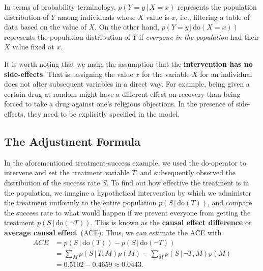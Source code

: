 \documentclass{article}
\newcommand{\giv}{\,|\,}
\begin{document}
In terms of probability terminology, $p(Y=y \giv X=x)$ represents the population distribution of $Y$ among individuals whose $X$ value is $x$, i.e., filtering a table of data based on the value of $X$. On the other hand, $p(Y=y \giv \text{do}(X=x))$ represents the population distribution of $Y$ if \textit{everyone in the population} had their $X$ value fixed at $x$. 

It is worth noting that we make the assumption that the \textbf{intervention has no side-effects}. That is, assigning the value $x$ for the variable $X$ for an individual does not alter subsequent variables in a direct way. For example, being given a certain drug at random might have a different effect on recovery than being forced to take a drug against one's religious objections. In the presence of side-effects, they need to be explicitly specified in the model.

\subsection{The Adjustment Formula}

In the aforementioned treatment-success example, we used the do-operator to intervene and set the treatment variable $T$, and subsequently observed the distribution of the success rate $S$. To find out how effective the treatment is in the population, we imagine a  hypothetical intervention by which we administer the treatment uniformly to the entire population $p(S \giv \text{do}(T))$, and compare the success rate to what would happen if we prevent everyone from getting the treatment $p(S \giv \text{do}(\neg T))$. This is known as the \textbf{causal effect difference} or \textbf{average causal effect}~(ACE). Thus, we can estimate the ACE with 
\begin{align*}
    ACE &= p(S \giv \text{do}(T)) - p(S \giv \text{do}(\neg T)) \\[1em]
    &= \sum_M p(S \giv T, M) p(M) - \sum_M p(S \giv \neg T, M) p(M) \\[1em]
    &= 0.5102 - 0.4659 \approx 0.0443 .
\end{align*}
\end{document}
